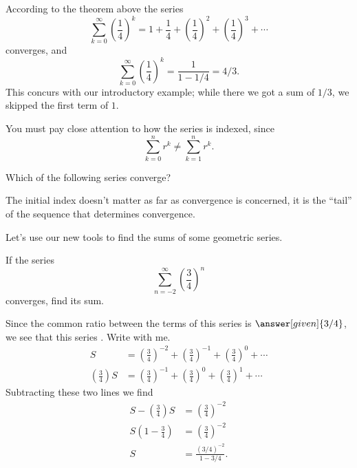 \documentclass{ximera}
\begin{document}
According to the theorem above the series
\[
\sum_{k=0}^\infty \left(\frac{1}{4}\right)^k = 1 + \frac{1}{4} + \left(\frac{1}{4}\right)^2 + \left(\frac{1}{4}\right)^3 + \cdots
\]
converges, and
\[
\sum_{k=0}^\infty  \left(\frac{1}{4}\right)^k = \frac{1}{1-1/4} = 4/3.
\]
This concurs with our introductory example; while there we got a sum
of $1/3$, we skipped the first term of $1$.

\begin{warning}
  You must pay close attention to how the series is indexed, since
  \[
  \sum_{k=0}^n r^k \ne \sum_{k=1}^n r^k.
  \]
\end{warning}


\begin{question}
  Which of the following series converge?
  \begin{selectAll}
  \end{selectAll}
  \begin{hint}
    The initial index doesn't matter as far as convergence is
    concerned, it is the ``tail'' of the sequence that determines
    convergence.
  \end{hint}
\end{question}

Let's use our new tools to find the sums of some geometric series.

\begin{example}
If the series 
\[
\sum_{n=-2}^\infty \left(\frac{3}{4}\right)^n
\]
converges, find its sum.
\begin{explanation}
Since the common ratio between the terms of this series is
$\answer[given]{3/4}$, we see that this series
. Write with me.
\begin{align*}
  S &= \left(\frac{3}{4}\right)^{-2} + \left(\frac{3}{4}\right)^{-1} + \left(\frac{3}{4}\right)^{0} + \cdots\\
  \left(\frac{3}{4}\right) S &= \left(\frac{3}{4}\right)^{-1} + \left(\frac{3}{4}\right)^{0} + \left(\frac{3}{4}\right)^{1} + \cdots
\end{align*}
Subtracting these two lines we find
\begin{align*}
  S -  \left(\frac{3}{4}\right) S  &= \left(\frac{3}{4}\right)^{-2}\\
  S\left(1-\frac{3}{4}\right) &= \left(\frac{3}{4}\right)^{-2}\\
  S &= \frac{(3/4)^{-2}}{1-3/4}.
\end{align*}
\end{explanation}
\end{example}
\end{document}
